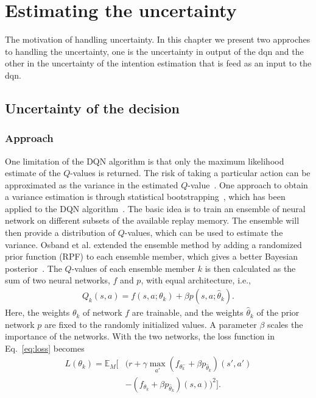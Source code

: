\chapter{Estimating the uncertainty}

The motivation of handling uncertainty. In this chapter we present two approches to handling the uncertainty, one is the uncertainty in output of the \gls{dqn} and the other in the uncertainty of the intention estimation that is feed as an input to the \gls{dqn}.


\section{Uncertainty of the decision}


\subsection{Approach}
One limitation of the DQN algorithm is that only the maximum likelihood estimate of the $Q$-values is returned. The risk of taking a particular action can be approximated as the variance in the estimated $Q$-value~\cite{Garcia2015}. One approach to obtain a variance estimation is through statistical bootstrapping~\cite{Efron1982}, which has been applied to the DQN algorithm~\cite{Osband2016}. The basic idea is to train an ensemble of neural network on different subsets of the available replay memory. The ensemble will then provide a distribution of $Q$-values, which can be used to estimate the variance. Osband et al. extended the ensemble method by adding a randomized prior function (RPF) to each ensemble member, which gives a better Bayesian posterior~\cite{Osband2018}. The $Q$-values of each ensemble member $k$ is then calculated as the sum of two neural networks, $f$ and $p$, with equal architecture, i.e.,
%
\begin{align}
	Q_k(s,a) = f(s,a;\theta_k) + \beta p(s,a;\hat{\theta}_k).
\end{align}
%
Here, the weights $\theta_k$ of network $f$ are trainable, and the weights $\hat{\theta}_k$ of the prior network $p$ are fixed to the randomly initialized values. A parameter $\beta$ scales the importance of the networks. With the two networks, the loss function in Eq.~\ref{eq:loss} becomes
%
\begin{align}
	\label{eq:loss_boot}
	L(\theta_k) = \mathbb{E}_M \Big[ & (r + \gamma \max_{a'} (f_{\theta^-_k}+\beta p_{\hat{\theta}_k})(s',a') \nonumber \\
	& - (f_{\theta_k}+ \beta p_{\hat{\theta}_k})(s,a) )^2 \Big].
\end{align} 


